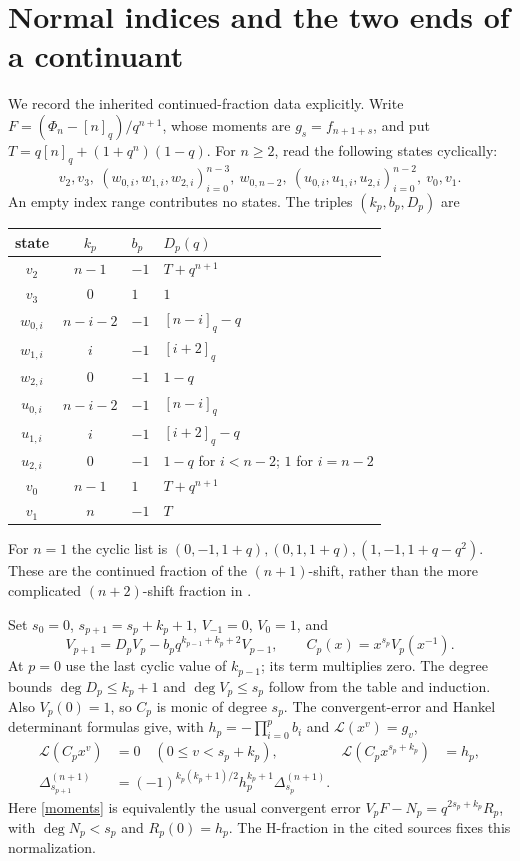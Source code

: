 \documentclass[11pt,a4paper]{article}
\newcommand{\D}[2]{\Delta_{#1}^{(#2)}}
\begin{document}
\section{Normal indices and the two ends of a continuant}
We record the inherited continued-fraction data explicitly. Write
$F=(\Phi_n-[n]_q)/q^{n+1}$, whose moments are $g_s=f_{n+1+s}$, and put
$T=q[n]_q+(1+q^n)(1-q)$. For $n\ge2$, read the following states cyclically:
\[
 v_2,v_3,\ (w_{0,i},w_{1,i},w_{2,i})_{i=0}^{n-3},\ w_{0,n-2},\
 (u_{0,i},u_{1,i},u_{2,i})_{i=0}^{n-2},\ v_0,v_1.
\]
An empty index range contributes no states. The triples $(k_p,b_p,D_p)$ are
\begin{center}\small
\begin{tabular}{@{}ccll@{}}\toprule
state&$k_p$&$b_p$&$D_p(q)$\\\midrule
$v_2$&$n-1$&$-1$&$T+q^{n+1}$\\
$v_3$&$0$&$1$&$1$\\
$w_{0,i}$&$n-i-2$&$-1$&$[n-i]_q-q$\\
$w_{1,i}$&$i$&$-1$&$[i+2]_q$\\
$w_{2,i}$&$0$&$-1$&$1-q$\\
$u_{0,i}$&$n-i-2$&$-1$&$[n-i]_q$\\
$u_{1,i}$&$i$&$-1$&$[i+2]_q-q$\\
$u_{2,i}$&$0$&$-1$&$1-q$ for $i<n-2$; $1$ for $i=n-2$\\
$v_0$&$n-1$&$1$&$T+q^{n+1}$\\
$v_1$&$n$&$-1$&$T$\\\bottomrule
\end{tabular}
\end{center}
For $n=1$ the cyclic list is
$(0,-1,1+q),(0,1,1+q),(1,-1,1+q-q^2)$.
These are the continued fraction of the $(n+1)$-shift, rather than the more
complicated $(n+2)$-shift fraction in \cite{HPplus}.

Set $s_0=0$, $s_{p+1}=s_p+k_p+1$, $V_{-1}=0$, $V_0=1$, and
\begin{equation}\label{continuant}
 V_{p+1}=D_pV_p-b_pq^{k_{p-1}+k_p+2}V_{p-1},\qquad
 C_p(x)=x^{s_p}V_p(x^{-1}).
\end{equation}
At $p=0$ use the last cyclic value of $k_{p-1}$; its term multiplies zero.
The degree bounds $\deg D_p\le k_p+1$ and $\deg V_p\le s_p$ follow
from the table and induction. Also $V_p(0)=1$, so $C_p$ is monic of degree
$s_p$. The convergent-error and Hankel determinant formulas give, with
$h_p=-\prod_{i=0}^p b_i$ and $\mathcal L(x^v)=g_v$,
\begin{align}
 \mathcal L(C_px^v)&=0\quad(0\le v<s_p+k_p),&
 \mathcal L(C_px^{s_p+k_p})&=h_p,\label{moments}\\
 \D{s_{p+1}}{n+1}&=(-1)^{k_p(k_p+1)/2}h_p^{k_p+1}\D{s_p}{n+1}.
 \label{normaldet}
\end{align}
Here \eqref{moments} is equivalently the usual convergent error
$V_pF-N_p=q^{2s_p+k_p}R_p$, with $\deg N_p<s_p$ and $R_p(0)=h_p$.
The H-fraction in the cited sources fixes this normalization.
\end{document}

